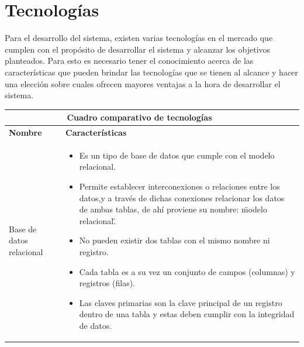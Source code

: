 \section{Tecnologías}
Para el desarrollo del sistema, existen varias tecnologías en el mercado que cumplen con el propósito de desarrollar el sistema y alcanzar los objetivos planteados. Para esto es necesario tener el conocimiento acerca de las características que pueden brindar las tecnologías que se tienen al alcance y hacer una elección sobre cuales ofrecen mayores ventajas a la hora de desarrollar el sistema.
\vspace{10mm}
\begin{table}[b!]
	\centering
	\vspace{-30mm}
	\begin{tabular}{|p{2cm}|ll}
		\hline
		        
		\multicolumn{2}{|c|}{{\bf Cuadro comparativo de tecnologías}} \\ 
		\hline
		\multicolumn{1}{|p{4cm}|}{{\bf Nombre}}                 &   
		\multicolumn{1}{p{10cm}|}{{\bf Características}}\\
		
		\hline
		\multicolumn{1}{|p{5cm}|}{Base de datos relacional}     &   
		\multicolumn{2}{p{10cm}|}{\begin{itemize}
		\vspace{-5mm}
		\item Es un tipo de base de datos que cumple con el modelo relacional.
		\item Permite establecer interconexiones o relaciones entre los datos,y a través de dichas conexiones relacionar los datos de ambas tablas, de ahí proviene su nombre: \"modelo relacional\".
		\item No pueden existir dos tablas con el mismo nombre ni registro.
		\item Cada tabla es a su vez un conjunto de campos (columnas) y registros (filas).
		\item Las claves primarias son la clave principal de un registro dentro de una tabla y estas deben cumplir con la integridad de datos.\cite{28}
		       
		\end{itemize}} \\
		         

\end{tabular}
\end{table}
